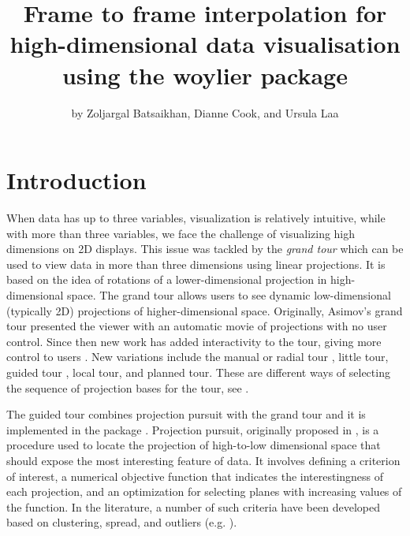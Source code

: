 \title{Frame to frame interpolation for high-dimensional data visualisation using the woylier package}


\author{by Zoljargal Batsaikhan, Dianne Cook, and Ursula Laa}

\maketitle


\section{Introduction}\label{introduction}

When data has up to three variables, visualization is relatively intuitive, while with more than three variables, we face the challenge of visualizing high dimensions on 2D displays. This issue was tackled by the \emph{grand tour} \citep{asimov_1985} which can be used to view data in more than three dimensions using linear projections. It is based on the idea of rotations of a lower-dimensional projection in high-dimensional space. The grand tour allows users to see dynamic low-dimensional (typically 2D) projections of higher-dimensional space. Originally, Asimov's grand tour presented the viewer with an automatic movie of projections with no user control. Since then new work has added interactivity to the tour, giving more control to users \citep{buja_cook_asimov_hurley_2005}. New variations include the manual \citep{cook_manual_1997} or radial tour \citep{mmtour}, little tour, guided tour \citep{grandtour1995}, local tour, and planned tour. These are different ways of selecting the sequence of projection bases for the tour, see \citet{tourrev}.

The guided tour combines projection pursuit with the grand tour and it is implemented in the  package \citep{tourr}. Projection pursuit, originally proposed in \citet{kruskal_1969}, is a procedure used to locate the projection of high-to-low dimensional space that should expose the most interesting feature of data. It involves defining a criterion of interest, a numerical objective function that indicates the interestingness of each projection, and an optimization for selecting planes with increasing values of the function. In the literature, a number of such criteria have been developed based on clustering, spread, and outliers (e.g. \citet{cook1993}).

